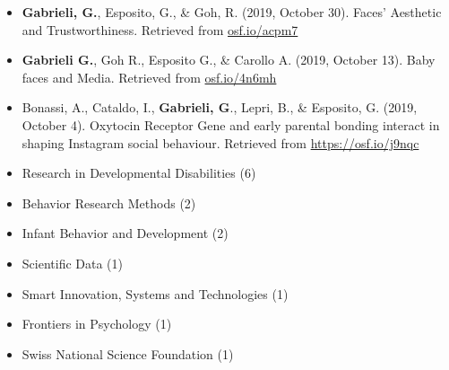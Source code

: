 \documentclass[10pt,a4paper]{altacv}
\begin{document}
\begin{fullwidth}
\begin{itemize}
            \item \textbf{Gabrieli, G.}, Esposito, G., \& Goh, R. (2019, October 30). Faces' Aesthetic and Trustworthiness. Retrieved from \href{https://osf.io/acpm7}{osf.io/acpm7}
            
            \item \textbf{Gabrieli G.}, Goh R., Esposito G., \& Carollo A. (2019, October 13). Baby faces and Media. Retrieved from \href{https://osf.io/4n6mh}{osf.io/4n6mh} 
            
            \item Bonassi, A., Cataldo, I., \textbf{Gabrieli, G}., Lepri, B., \& Esposito, G. (2019, October 4). Oxytocin Receptor Gene and early parental bonding interact in shaping Instagram social behaviour. Retrieved from \href{https://osf.io/j9nqc}{https://osf.io/j9nqc} 
	
	\end{itemize}
		
		\begin{itemize}
			\item Research in Developmental Disabilities (6)
			\item Behavior Research Methods (2)
			\item Infant Behavior and Development (2)
			\item Scientific Data (1)
			\item Smart Innovation, Systems and Technologies (1)
			\item Frontiers in Psychology (1)
			\item Swiss National Science Foundation (1)
		\end{itemize}
		
		\divider
		
		
		
		
		
		
		
		
		
	\end{fullwidth}
	
\end{document}
